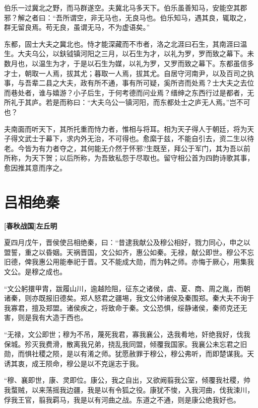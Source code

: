 \documentclass[UTF8,titlepage,oneside]{ctexbook}
\begin{document}
伯乐一过冀北之野，而马群遂空。夫冀北马多天下。伯乐虽善知马，安能空其郡邪？解之者曰：“吾所谓空，非无马也，无良马也。伯乐知马，遇其良，辄取之，群无留良焉。苟无良，虽谓无马，不为虚语矣。”

东都，固士大夫之冀北也。恃才能深藏而不市者，洛之北涯曰石生，其南涯曰温生。大夫乌公，以鈇钺镇河阳之三月，以石生为才，以礼为罗，罗而致之幕下。未数月也，以温生为才，于是以石生为媒，以礼为罗，又罗而致之幕下。东都虽信多才士，朝取一人焉，拔其尤；暮取一人焉，拔其尤。自居守河南尹，以及百司之执事，与吾辈二县之大夫，政有所不通，事有所可疑，奚所咨而处焉？士大夫之去位而巷处者，谁与嬉游？小子后生，于何考德而问业焉？缙绅之东西行过是都者，无所礼于其庐。若是而称曰：“大夫乌公一镇河阳，而东都处士之庐无人焉。”岂不可也？

夫南面而听天下，其所托重而恃力者，惟相与将耳。相为天子得人于朝廷，将为天子得文武士于幕下，求内外无治，不可得也。愈縻于兹，不能自引去，资二生以待老。今皆为有力者夺之，其何能无介然于怀邪?生既至，拜公于军门，其为吾以前所称，为天下贺；以后所称，为吾致私怨于尽取也。留守相公首为四韵诗歌其事，愈因推其意而序之。


\chapter*{吕相绝秦}
\begin{center}
	\textbf{[春秋战国]左丘明}
\end{center}


夏四月戊午，晋侯使吕相绝秦，曰：“昔逮我献公及穆公相好，戮力同心，申之以盟誓，重之以昏姻。天祸晋国，文公如齐，惠公如秦。无禄，献公即世。穆公不忘旧德，俾我惠公用能奉祀于晋。又不能成大勋，而为韩之师。亦悔于厥心，用集我文公。是穆之成也。


“文公躬擐甲胄，跋履山川，逾越险阻，征东之诸侯，虞、夏、商、周之胤，而朝诸秦，则亦既报旧德矣。郑人怒君之疆埸，我文公帅诸侯及秦围郑。秦大夫不询于我寡君，擅及郑盟。诸侯疾之，将致命于秦。文公恐惧，绥静诸侯，秦师克还无害，则是我有大造于西也。


“无禄，文公即世；穆为不吊，蔑死我君，寡我襄公，迭我肴地，奸绝我好，伐我保城。殄灭我费滑，散离我兄弟，挠乱我同盟，倾覆我国家。我襄公未忘君之旧勋，而惧社稷之陨，是以有淆之师。犹愿赦罪于穆公，穆公弗听，而即楚谋我。天诱其衷，成王陨命，穆公是以不克逞志于我。


“穆、襄即世，康、灵即位。康公，我之自出，又欲阙翦我公室，倾覆我社稷，帅我蝥贼，以来荡摇我边疆，我是以有令狐之役。康犹不悛，入我河曲，伐我涑川，俘我王官，翦我羁马，我是以有河曲之战。东道之不通，则是康公绝我好也。
\end{document}
